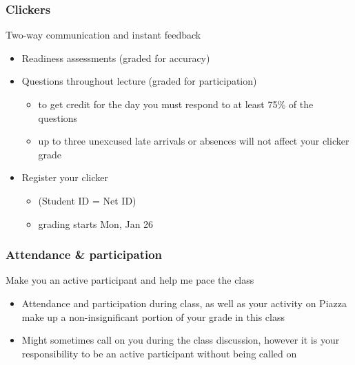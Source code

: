 \documentclass[11pt,containsverbatim,handout,xcolor=xelatex,dvipsnames,table]{beamer}
\begin{document}

\begin{frame}
\frametitle{Clickers}

 Two-way communication and instant feedback

\begin{itemize}
\item Readiness assessments (graded for accuracy)

\item Questions throughout lecture (graded for participation)
\begin{itemize}
\item to get credit for the day you must respond to at least 75\% of the questions
\item up to three unexcused late arrivals or absences will not affect your clicker grade
\end{itemize}

\item Register your clicker
\begin{itemize}
\item {} (Student ID = Net ID)
\item grading starts Mon, Jan 26
\end{itemize}

\end{itemize}

\end{frame}


\begin{frame}
\frametitle{Attendance \& participation}

 Make you an active participant and help me pace the class 

\begin{itemize}

\item Attendance and participation during class, as well as your activity on Piazza make up a non-insignificant portion of your grade in this class

\item Might sometimes call on you during the class discussion, however it is your responsibility to be an active participant without being called on

\end{itemize}

\end{frame}
\end{document}

